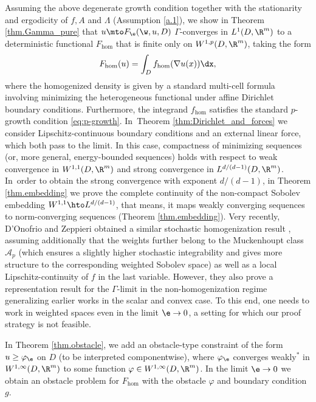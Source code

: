 Assuming the above degenerate growth condition together with the stationarity and ergodicity of $f,A$ and $\Lambda$ (\cf Assumption \ref{a.1}), we show in Theorem \ref{thm.Gamma_pure} that $u\mto F_{\e}(\w,u,D)$ $\Gamma$-converges in $L^1(D,\R^m)$ to a deterministic functional $F_{\hom}$ that is finite only on $W^{1,p}(D,\R^m)$, taking the form\vspace*{-3pt}
\begin{equation*}
F_{\hom}(u)=\int_D f_{\hom}(\nabla u(x))\dx,
\end{equation*}
where the homogenized density is given by a standard multi-cell formula involving minimizing the heterogeneous functional under affine Dirichlet boundary conditions. Furthermore, the integrand $f_{\hom}$ satisfies the standard $p$-growth condition \eqref{eq:p-growth}. In~Theorem \ref{thm:Dirichlet_and_forces} we consider Lipschitz-continuous boundary conditions and an external linear force, which both pass to the limit. In this case, compactness of minimizing sequences (or, more general, energy-bounded sequences) holds with respect to weak convergence in $W^{1,1}(D,\R^m)$ and strong convergence in $L^{d/(d-1)}(D,\R^m)$. In~order to obtain the strong convergence with exponent $d/(d-1)$, in Theorem \ref{thm.embedding} we prove the complete continuity of the non-compact Sobolev embedding $W^{1,1}\hto\nobreak L^{d/(d-1)}$, that means, it maps weakly converging sequences to norm-converging sequences (\cf Theorem \ref{thm.embedding}). Very recently, D'Onofrio and Zeppieri obtained a similar stochastic homogenization result \cite{D'OnZe}, assuming additionally that the weights further belong to the Muckenhoupt class $\mathcal{A}_p$ (which ensures a slightly higher stochastic integrability and gives more structure to the corresponding weighted Sobolev space) as well as a local Lipschitz-continuity of $f$ in the last variable. However, they also prove a representation result for the $\Gamma$-limit in the non-homogenization regime generalizing earlier works \cite{CaSo,DeArc} in the scalar and convex case. To this end, one needs to work in weighted spaces even in the limit $\e\to 0$, a setting for which our proof strategy is not feasible.

In Theorem \ref{thm.obstacle}, we add an obstacle-type constraint of the form $u\geq\varphi_{\e}$ on $D$ (to be interpreted componentwise), where $\varphi_{\e}$ converges weakly$^*$ in $W^{1,\infty}(D,\R^m)$ to some function $\varphi\in W^{1,\infty}(D,\R^m)$. In the limit $\e\to 0$ we obtain an obstacle problem for $F_{\hom}$ with the obstacle $\varphi$ and boundary condition $g$.

